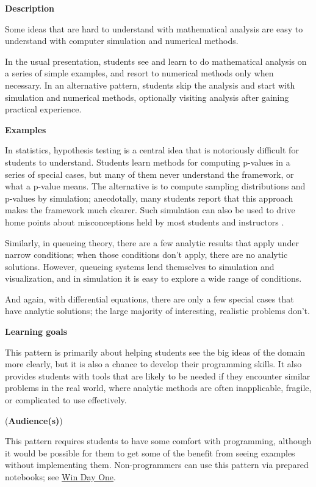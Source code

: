 \documentclass[]{book}
\begin{document}
\textbf{Description}

Some ideas that are hard to understand with mathematical analysis are
easy to understand with computer simulation and numerical methods.

In the usual presentation, students see and learn to do mathematical
analysis on a series of simple examples, and resort to numerical methods
only when necessary. In an alternative pattern, students skip the
analysis and start with simulation and numerical methods, optionally
visiting analysis after gaining practical experience.

\textbf{Examples}

In statistics, hypothesis testing is a central idea that is notoriously
difficult for students to understand. Students learn methods for
computing p-values in a series of special cases, but many of them never
understand the framework, or what a p-value means. The alternative is to
compute sampling distributions and p-values by simulation; anecdotally,
many students report that this approach makes the framework much
clearer. Such simulation can also be used to drive home points about
misconceptions held by most students and instructors
\citep{HallerKrauss2002}.

Similarly, in queueing theory, there are a few analytic results that
apply under narrow conditions; when those conditions don't apply, there
are no analytic solutions. However, queueing systems lend themselves to
simulation and visualization, and in simulation it is easy to explore a
wide range of conditions.

And again, with differential equations, there are only a few special
cases that have analytic solutions; the large majority of interesting,
realistic problems don't.

\textbf{Learning goals}

This pattern is primarily about helping students see the big ideas of
the domain more clearly, but it is also a chance to develop their
programming skills. It also provides students with tools that are likely
to be needed if they encounter similar problems in the real world, where
analytic methods are often inapplicable, fragile, or complicated to use
effectively.

(\textbf{Audience(s)})

This pattern requires students to have some comfort with programming,
although it would be possible for them to get some of the benefit from
seeing examples without implementing them. Non-programmers can use this
pattern via prepared notebooks; see \protect\hyperlink{win-day-one}{Win
Day One}.
\end{document}
